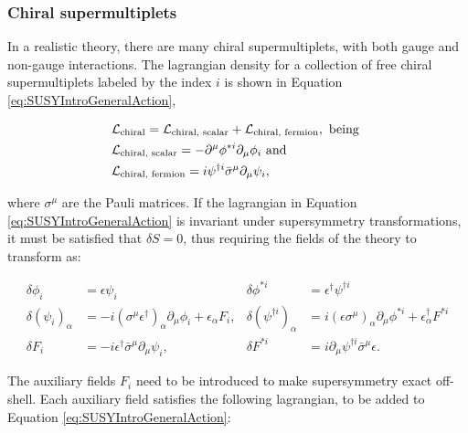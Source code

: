 \subsubsection{Chiral supermultiplets}

In a realistic theory, there are many chiral supermultiplets, with both gauge and non-gauge interactions.
The lagrangian density for a collection of free chiral supermultiplets labeled by the index $i$ is shown in Equation \ref{eq:SUSYIntroGeneralAction},

\begin{equation}
\begin{split}
&\lagrangian_{\text{chiral}} = \lagrangian_{\text{chiral, scalar}} + \lagrangian_{\text{chiral, fermion}}, \text{     being  } \\
&\lagrangian_{\text{chiral, scalar}} = - \partial^{\mu} \phi^{\ast i} \partial_{\mu} \phi_i \text{      and  } \\
&\lagrangian_{\text{chiral, fermion}} = i\psi^{\dagger i} \bar{\sigma}^\mu \partial_{\mu} \psi_i ,
\end{split}
\label{eq:SUSYIntroGeneralAction}
\end{equation}

\noindent where $\sigma^\mu$ are the Pauli matrices.
If the lagrangian in Equation \ref{eq:SUSYIntroGeneralAction} is invariant under supersymmetry transformations, it must be satisfied that $\delta S = 0$, thus requiring the fields of the theory to transform as:

\begin{align}
\delta \phi_i &= \epsilon \psi_i  &  \delta \phi^{\ast i} &= \epsilon^\dagger \psi^{\dagger i} \\
\delta (\psi_i)_\alpha &= -i(\sigma^\mu \epsilon^{\dagger})_\alpha \partial_\mu \phi_i + \epsilon_\alpha F_i, & \delta (\psi^{\dagger i})_\alpha &= i(\epsilon \sigma^\mu)_\alpha \partial_\mu \phi^{\ast i} + \epsilon^{\dagger}_\alpha F^{\ast i} \\
\delta F_i &= -i\epsilon^\dagger \bar{\sigma}^\mu \partial_\mu \psi_i, & \delta F^{\ast i} &= i\partial_\mu \psi^{\dagger i} \bar{\sigma}^\mu \epsilon.
\label{eq:SUSYFieldsTransformation}
\end{align}

The auxiliary fields $F_i$ need to be introduced to make supersymmetry exact off-shell.
Each auxiliary field satisfies the following lagrangian, to be added to Equation \ref{eq:SUSYIntroGeneralAction}:


